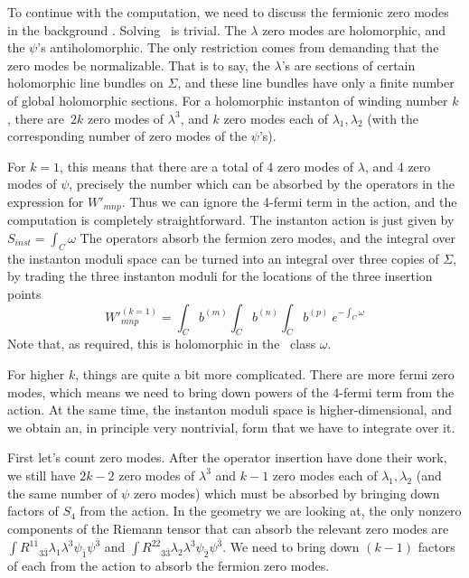 To continue with the computation, we need to discuss the fermionic zero modes
in the background \ratfun. Solving \ is trivial. The $\lambda$
zero modes are holomorphic, and the $\psi$'s antiholomorphic. The only
restriction
comes from demanding that the zero modes be normalizable. That is to say, the
$\lambda$'s are sections of certain holomorphic line bundles on $\Sigma$, and
these line bundles have only a finite number of global holomorphic sections.
For a holomorphic instanton of winding number $k$ \ratfun, there are\ $2k$ zero modes of
$\lambda^3$, and $k$ zero modes each of $\lambda_1,\lambda_2$ (with the
corresponding number of zero modes of the $\psi$'s).

For $k=1$, this means
that there are a total of 4 zero modes of $\lambda$, and 4 zero modes of
$\psi$, precisely the number which can be absorbed by the operators in the
expression for $W'_{mnp}$.
Thus we can ignore the 4-fermi term in the action, and the
computation is completely straightforward. The instanton action is just
given by $S_{inst}=\int_C\omega$ The operators absorb the fermion zero modes,
and  the integral over the instanton moduli space can be turned into an
integral over three copies of  $\Sigma$, by trading the three instanton
moduli for the locations of the three insertion points 
$$W'^{(k=1)}_{mnp}=\int_C b^{(m)}\int_C b^{(n)}\int_C
b^{(p)}\ e^{-\int_C\omega}$$
Note that, as required, this is holomorphic in the \Ka\ class $\omega$.

For higher $k$, things are quite a bit more complicated. There are more fermi
zero modes, which means we need to bring down powers of the 4-fermi term
from the action. At the same time, the instanton moduli space is
higher-dimensional, and we obtain an, in principle very nontrivial, form that
we have to integrate over it.

First let's count zero modes. After the operator insertion have done their
work, we still have $2k-2$ zero modes of $\lambda^3$ and $k-1$ zero modes
each of $\lambda_1,\lambda_2$ (and the same number of $\psi$ zero modes)
which must be absorbed by bringing down
factors of $S_4$ from the action. In the geometry we are looking at, the only
nonzero components of the Riemann tensor that can absorb the relevant zero
modes are $\int
R^{1\bar1}{}_{3\bar3}\lambda_1\lambda^3\psi_{\bar 1}\psi^{\bar 3}$ and
$\int
R^{2\bar2}{}_{3\bar3}\lambda_2\lambda^3\psi_{\bar 2}\psi^{\bar
3}$. We need to bring down $(k-1)$ factors of each from the action to
absorb the fermion zero modes.

